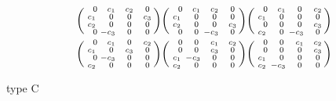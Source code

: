 \documentclass[a4paper]{amsart}
\theoremstyle{definition}
\theoremstyle{remark}
\newenvironment{psmatrix}{\left(\begin{smallmatrix}}{\end{smallmatrix}\right)}
\numberwithin{equation}{section}
\begin{document}
\begin{minipage}[b]{0.48\columnwidth}
\begin{align*}
\begin{psmatrix}
\phantom{-}0&\phantom{-}c_{1}&\phantom{-}c_{2}&\phantom{-}0\\
c_{1}&\phantom{-}0&\phantom{-}0&\phantom{-}c_{3}\\
c_{2}&\phantom{-}0&\phantom{-}0&\phantom{-}0\\
\phantom{-}0&-c_{3}&\phantom{-}0&\phantom{-}0
\end{psmatrix}
\begin{psmatrix}
\phantom{-}0&\phantom{-}c_{1}&\phantom{-}c_{2}&\phantom{-}0\\
c_{1}&\phantom{-}0&\phantom{-}0&\phantom{-}0\\
c_{2}&\phantom{-}0&\phantom{-}0&\phantom{-}c_{3}\\
\phantom{-}0&\phantom{-}0&-c_{3}&\phantom{-}0
\end{psmatrix}
\begin{psmatrix}
\phantom{-}0&\phantom{-}c_{1}&\phantom{-}0&\phantom{-}c_{2}\\
c_{1}&\phantom{-}0&\phantom{-}0&\phantom{-}0\\
\phantom{-}0&\phantom{-}0&\phantom{-}0&\phantom{-}c_{3}\\
c_{2}&\phantom{-}0&-c_{3}&\phantom{-}0
\end{psmatrix}\\
\begin{psmatrix}
\phantom{-}0&\phantom{-}c_{1}&\phantom{-}0&\phantom{-}c_{2}\\
c_{1}&\phantom{-}0&\phantom{-}c_{3}&\phantom{-}0\\
\phantom{-}0&-c_{3}&\phantom{-}0&\phantom{-}0\\
c_{2}&\phantom{-}0&\phantom{-}0&\phantom{-}0
\end{psmatrix}
\begin{psmatrix}
\phantom{-}0&\phantom{-}0&\phantom{-}c_{1}&\phantom{-}c_{2}\\
\phantom{-}0&\phantom{-}0&\phantom{-}c_{3}&\phantom{-}0\\
c_{1}&-c_{3}&\phantom{-}0&\phantom{-}0\\
c_{2}&\phantom{-}0&\phantom{-}0&\phantom{-}0
\end{psmatrix}\begin{psmatrix}
\phantom{-}0&\phantom{-}0&\phantom{-}c_{1}&\phantom{-}c_{2}\\
\phantom{-}0&\phantom{-}0&\phantom{-}0&\phantom{-}c_{3}\\
c_{1}&\phantom{-}0&\phantom{-}0&\phantom{-}0\\
c_{2}&-c_{3}&\phantom{-}0&\phantom{-}0
\end{psmatrix}
\end{align*}
\begin{center}type C\end{center}
\end{minipage}
\end{document}
